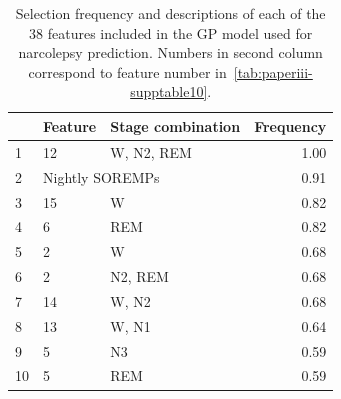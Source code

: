 \begin{table}
    \small
    \caption[Narcolepsy features selection frequencies]{Selection frequency and descriptions of each of the 38 features included in the \acl{GP} model used for narcolepsy prediction. Numbers in second column correspond to feature number in~\cref{tab:paperiii-supptable10}.}
    \label{tab:paperiii-supptable05}
    \begin{tabular}{@{}lp{6cm}lr@{}}
        \toprule
           & Feature                                                & Stage combination  & Frequency \\ \midrule
        1  & 12                                                     & \ac{W}, \ac{N2}, \ac{REM}             & 1.00                         \\
        2  & \multicolumn{2}{l}{Nightly \acp{SOREMP}}                                                       & 0.91                         \\
        3  & 15                                                     & \ac{W}                                & 0.82                         \\
        4  & 6                                                      & \ac{REM}                              & 0.82                         \\
        5  & 2                                                      & \ac{W}                                & 0.68                         \\
        6  & 2                                                      & \ac{N2}, \ac{REM}                     & 0.68                         \\
        7  & 14                                                     & \ac{W}, \ac{N2}                       & 0.68                         \\
        8  & 13                                                     & \ac{W}, \ac{N1}                       & 0.64                         \\
        9  & 5                                                      & \ac{N3}                               & 0.59                         \\
        10 & 5                                                      & \ac{REM}                              & 0.59                         \\

\end{tabular}
\end{table}
